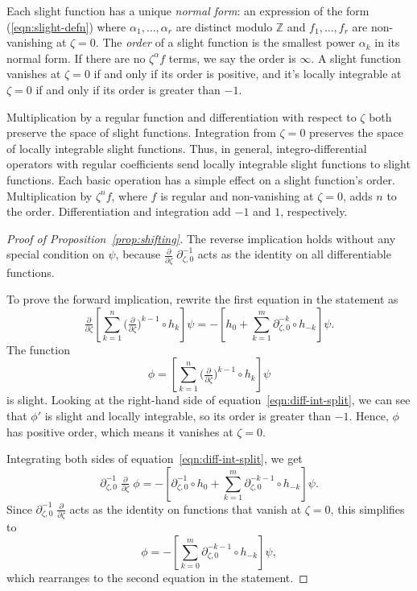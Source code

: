 \documentclass{article}
\theoremstyle{plain}
\newcommand{\Z}{\mathbb{Z}}
\newcommand{\fracderiv}[3]{\partial^{#1}_{#2, #3}}
\begin{document}
Each slight function has a unique {\em normal form}: an expression of the form (\ref{eqn:slight-defn}) where $\alpha_1, \ldots, \alpha_r$ are distinct modulo $\Z$ and $f_1, \ldots, f_r$ are non-vanishing at $\zeta = 0$. The {\em order} of a slight function is the smallest power $\alpha_k$ in its normal form. If there are no $\zeta^\alpha f$ terms, we say the order is $\infty$. A slight function vanishes at $\zeta = 0$ if and only if its order is positive, and it's locally integrable at $\zeta = 0$ if and only if its order is greater than $-1$.

Multiplication by a regular function and differentiation with respect to $\zeta$ both preserve the space of slight functions. Integration from $\zeta = 0$ preserves the space of locally integrable slight functions. Thus, in general, integro-differential operators with regular coefficients send locally integrable slight functions to slight functions. Each basic operation has a simple effect on a slight function's order. Multiplication by $\zeta^n f$, where $f$ is regular and non-vanishing at $\zeta = 0$, adds $n$ to the order. Differentiation and integration add $-1$ and $1$, respectively.
\begin{proof}[Proof of Proposition~\ref{prop:shifting}]
The reverse implication holds without any special condition on $\psi$, because $\tfrac{\partial}{\partial \zeta}\;\fracderiv{-1}{\zeta}{0}$ acts as the identity on all differentiable functions.

To prove the forward implication, rewrite the first equation in the statement as
\begin{equation}\label{eqn:diff-int-split}
\tfrac{\partial}{\partial \zeta} \left[ \sum_{k = 1}^n \big(\tfrac{\partial}{\partial \zeta}\big)^{k-1} \circ h_k \right] \psi = -\left[ h_0 + \sum_{k = 1}^m \fracderiv{-k}{\zeta}{0} \circ h_{-k} \right] \psi.
\end{equation}
The function
\[ \phi = \left[ \sum_{k = 1}^n \big(\tfrac{\partial}{\partial \zeta}\big)^{k-1} \circ h_k \right] \psi \]
is slight. Looking at the right-hand side of equation~\ref{eqn:diff-int-split}, we can see that $\phi'$ is slight and locally integrable, so its order is greater than $-1$. Hence, $\phi$ has positive order, which means it vanishes at $\zeta = 0$.

Integrating both sides of equation~\ref{eqn:diff-int-split}, we get
\[ \fracderiv{-1}{\zeta}{0}\;\tfrac{\partial}{\partial \zeta}\;\phi = -\left[ \fracderiv{-1}{\zeta}{0} \circ h_0 + \sum_{k = 1}^m \fracderiv{-k-1}{\zeta}{0} \circ h_{-k} \right] \psi. \]
Since $\fracderiv{-1}{\zeta}{0}\;\tfrac{\partial}{\partial \zeta}$ acts as the identity on functions that vanish at $\zeta = 0$, this simplifies to
\[ \phi = -\left[ \sum_{k = 0}^m \fracderiv{-k-1}{\zeta}{0} \circ h_{-k} \right] \psi, \]
which rearranges to the second equation in the statement.
\end{proof}
\end{document}
